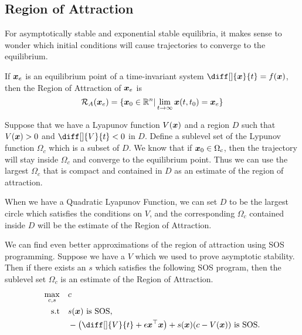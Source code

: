 \subsection{Region of Attraction}
For asymptotically stable and exponential stable equilibria, it makes sense to
wonder which initial conditions will cause trajectories to converge to the
equilibrium.
\begin{definition}
	If $\boldsymbol{x}_e$ is an equilibrium point of a time-invariant system $\diff[]{\bs{x}}{t}
	= f(\bs{x})$, then the Region of Attraction of $\boldsymbol{x}_e$ is \[
		\mathcal{R}_A(\boldsymbol{x}_e) = \{ \boldsymbol{x}_0 \in \mathbb{R}^n | \lim_{t\to\infty}
		\boldsymbol{x}(t, t_0) = \boldsymbol{x}_e \}
	\]
	\label{defn:region-of-attraction}
\end{definition}
Suppose that we have a Lyapunov function $V(\boldsymbol{x})$ and a region $D$ such that
$V(\boldsymbol{x}) > 0$ and $\diff[]{V}{t} < 0$ in $D$. Define a sublevel set of the
Lypunov function $\Omega_c$ which is a subset of $D$. We know that if
$\boldsymbol{x}_0\in\Omega_c$, then the trajectory will stay inside $\Omega_c$ and
converge to the equilibrium point. Thus we can use the largest $\Omega_c$ that
is compact and contained in $D$ as an estimate of the region of attraction.

When we have a Quadratic Lyapunov Function, we can set $D$ to be the largest
circle which satisfies the conditions on $V$, and the corresponding $\Omega_c$
contained inside $D$ will be the estimate of the Region of Attraction.

We can find even better approximations of the region of attraction using SOS
programming. Suppose we have a $V$ which we used to prove asymptotic stability.
Then if there exists an $s$ which satisfies the following SOS program, then the
sublevel set $\Omega_c$ is an estimate of the Region of Attraction.
\begin{align*}
	\max_{c, s} &\quad c\\
	\text{s.t} &\quad s(\bs{x}) \text{ is SOS,}\\
	&\quad -\left(\diff[]{V}{t} + \epsilon \bs{x}^\top \bs{x}\right) + s(\bs{x})(c -
	V(\bs{x})) \text{ is SOS.}
\end{align*}
